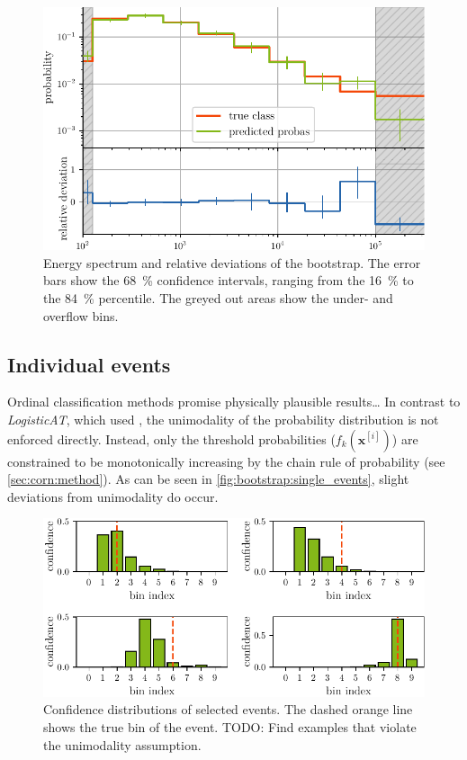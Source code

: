 
\begin{figure}
  \centering
  \includegraphics[scale=1]{content/plots/bootstrap:spectrum_full.pdf}
  \caption{
    Energy spectrum and relative deviations of the bootstrap.
    The error bars show the \SI{68}{\percent} confidence intervals,
    ranging from the \SI{16}{\percent} to the \SI{84}{\percent} percentile.
    The greyed out areas show the under- and overflow bins.
  }
  \label{fig:bootstrap:spectrum}
\end{figure}


\subsection{Individual events}
Ordinal classification methods promise physically plausible results… %
In contrast to \emph{LogisticAT},
    which \citeauthor{dsea_jan} used \cite{dsea_jan},
  the unimodality of the probability distribution is not enforced directly.
Instead,
  only the threshold probabilities ($f_k(\mathbf{x}^{[i]})$) are constrained to be monotonically increasing
  by the chain rule of probability
  (see \autoref{sec:corn:method}).
As can be seen in \autoref{fig:bootstrap:single_events},
  slight deviations from unimodality do occur.


\begin{figure}
  \centering
  \includegraphics[scale=1]{content/plots/single_events_lessheight.pdf}
  \caption{
    Confidence distributions of selected events.
    The dashed orange line shows the true bin of the event.
    TODO: Find examples that violate the unimodality assumption.
  }
  \label{fig:bootstrap:single_events}
\end{figure}
